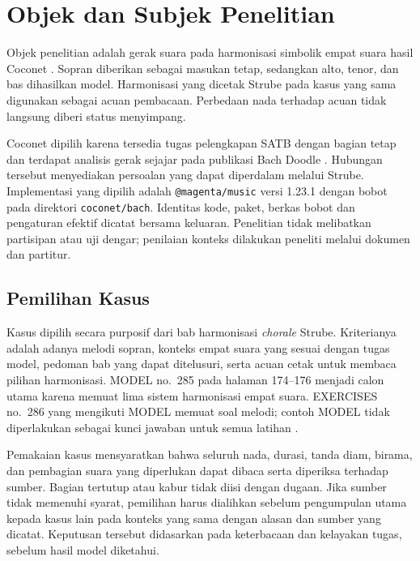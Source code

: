\section{Objek dan Subjek Penelitian}\label{sec:objek-dan-subjek}

Objek penelitian adalah gerak suara pada harmonisasi simbolik empat suara hasil Coconet \parencite{huang2017}. Sopran diberikan sebagai masukan tetap, sedangkan alto, tenor, dan bas dihasilkan model. Harmonisasi yang dicetak Strube pada kasus yang sama digunakan sebagai acuan pembacaan. Perbedaan nada terhadap acuan tidak langsung diberi status menyimpang.

Coconet dipilih karena tersedia tugas pelengkapan SATB dengan bagian tetap dan terdapat analisis gerak sejajar pada publikasi Bach Doodle \parencite[798]{huang2019}. Hubungan tersebut menyediakan persoalan yang dapat diperdalam melalui Strube. Implementasi yang dipilih adalah \texttt{@magenta/music} versi 1.23.1 dengan bobot pada direktori \texttt{coconet/bach}. Identitas kode, paket, berkas bobot dan pengaturan efektif dicatat bersama keluaran. Penelitian tidak melibatkan partisipan atau uji dengar; penilaian konteks dilakukan peneliti melalui dokumen dan partitur.

\subsection{Pemilihan Kasus}\label{sec:populasi}

Kasus dipilih secara purposif dari bab harmonisasi \textit{chorale} Strube. Kriterianya adalah adanya melodi sopran, konteks empat suara yang sesuai dengan tugas model, pedoman bab yang dapat ditelusuri, serta acuan cetak untuk membaca pilihan harmonisasi. MODEL no.~285 pada halaman 174--176 menjadi calon utama karena memuat lima sistem harmonisasi empat suara. EXERCISES no.~286 yang mengikuti MODEL memuat soal melodi; contoh MODEL tidak diperlakukan sebagai kunci jawaban untuk semua latihan \parencite[174--176]{strube1928}.

Pemakaian kasus mensyaratkan bahwa seluruh nada, durasi, tanda diam, birama, dan pembagian suara yang diperlukan dapat dibaca serta diperiksa terhadap sumber. Bagian tertutup atau kabur tidak diisi dengan dugaan. Jika sumber tidak memenuhi syarat, pemilihan harus dialihkan sebelum pengumpulan utama kepada kasus lain pada konteks yang sama dengan alasan dan sumber yang dicatat. Keputusan tersebut didasarkan pada keterbacaan dan kelayakan tugas, sebelum hasil model diketahui.

